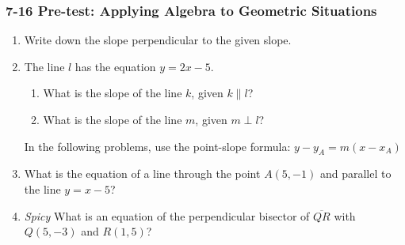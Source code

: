 \documentclass[12pt, twoside]{article}
\begin{document}
\subsubsection*{7-16 Pre-test: Applying Algebra to Geometric Situations}
  \begin{enumerate}

  \item Write down the slope perpendicular to the given slope. \vspace{0.5cm}
    \begin{enumerate}
    \end{enumerate}

  \item The line $l$ has the equation $y=2 x-5$.
  \begin{enumerate}
    \item What is the slope of the line $k$, given $k \parallel l$?
    \vspace{1cm}
    \item What is the slope of the line $m$, given $m \perp l$?
    \vspace{1cm}
  \end{enumerate}

  In the following problems, use the point-slope formula: $y-y_A=m (x-x_A)$
    \item What is the equation of a line through the point $A(5,-1)$ and parallel to the line $y=x-5$?  \vspace{2cm}

    \item \emph{Spicy} What is an equation of the perpendicular bisector of $\overline{QR}$ with $Q(5,-3)$ and $R(1,5)$? \vspace{5cm}


 \newpage


\end{enumerate}
\end{document}
